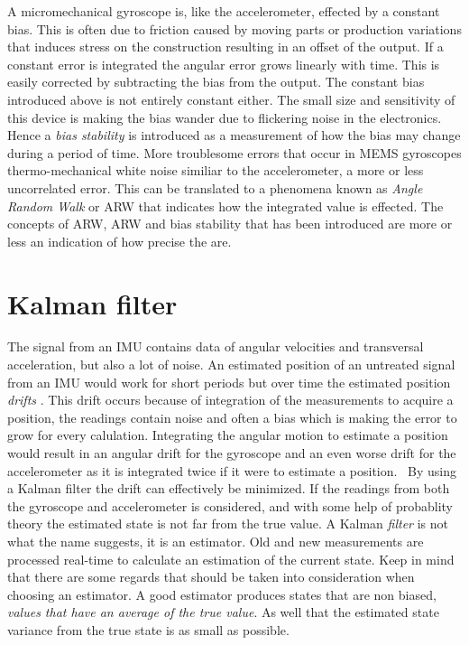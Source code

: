 \documentclass[a4paper,11pt]{kth-mag}
\begin{document}
A micromechanical gyroscope is, like the accelerometer, effected by a constant bias. This is often due to friction caused by moving parts or production variations that induces stress on the construction resulting in an offset of the output. If a constant error is integrated the angular error grows linearly with time. This is easily corrected by subtracting the bias from the output.
The constant bias introduced above is not entirely constant either. The small size and sensitivity of this device is making the bias wander due to flickering noise in the electronics. Hence a \textit{bias stability} is introduced as a measurement of how the bias may change during a period of time.
More troublesome errors that occur in MEMS gyroscopes thermo-mechanical white noise similiar to the accelerometer, a more or less uncorrelated error. This can be translated to a phenomena known as \textit{Angle Random Walk} or ARW that indicates how the integrated value is effected.
The concepts of ARW, ARW and bias stability that has been introduced are more or less an indication of how precise the  are. \cite{IMUintro}  

\section{Kalman filter}
The signal from an IMU contains data of angular velocities and transversal acceleration, but also a lot of noise. An estimated position of an untreated signal from an IMU would work for short periods but over time the estimated position \textit{drifts} \cite{MEMSdrift}. This drift occurs because of integration of the measurements to acquire a position, the readings contain noise and often a bias which is making the  error to grow for every calulation. Integrating the angular motion to estimate a position would result in an angular drift for the gyroscope and an even worse drift for the accelerometer as it is integrated twice if it were to estimate a position.  \
By using a Kalman filter the drift can effectively be minimized. If the readings from both the gyroscope and accelerometer is considered, and with some help of probablity theory the estimated state is not far from the true value.  A Kalman \textit{filter} is not what the name suggests, it is an estimator. Old and new measurements are processed real-time to calculate an estimation of the current state.
Keep in mind that there are some regards that should be taken into consideration when choosing an estimator.
A good estimator produces states that are non biased, \emph{values that have an average  of the true value}. As well that the estimated state variance from the true state is as small as possible.\cite{Simon2001}
\end{document}
